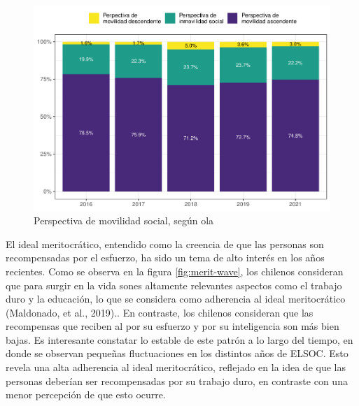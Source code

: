 \documentclass[
  12pt,
]{book}
\begin{document}
\begin{figure}

{\centering \includegraphics{reporte-elsoc_files/figure-latex/mov-soc-rec-1} 

}

\caption{Perspectiva de movilidad social, según ola}\label{fig:mov-soc-rec}
\end{figure}

El ideal meritocrático, entendido como la creencia de que las personas son recompensadas por el esfuerzo, ha sido un tema de alto interés en los años recientes. Como se observa en la figura \ref{fig:merit-wave}, los chilenos consideran que para surgir en la vida sones altamente relevantes aspectos como el trabajo duro y la educación, lo que se considera como adherencia al ideal meritocrático (Maldonado, et al., 2019).. En contraste, los chilenos consideran que las recompensas que reciben al por su esfuerzo y por su inteligencia son más bien bajas. Es interesante constatar lo estable de este patrón a lo largo del tiempo, en donde se observan pequeñas fluctuaciones en los distintos años de ELSOC. Esto revela una alta adherencia al ideal meritocrático, reflejado en la idea de que las personas deberían ser recompensadas por su trabajo duro, en contraste con una menor percepción de que esto ocurre.
\end{document}
